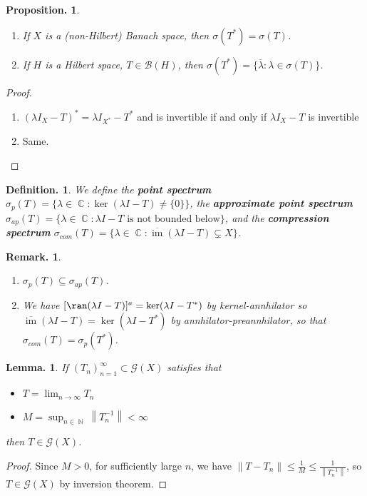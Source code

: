 \documentclass[11pt, a4paper]{memoir}
\DeclareMathOperator{\N}{{\mathbb{N}}}
\DeclareMathOperator{\C}{{\mathbb{C}}}
\newcommand{\norm}[1]{\ensuremath{\left\lVert#1\right\rVert}}
\theoremstyle{change}
\newtheorem{lemma}[theorem]{Lemma.}
\newtheorem{proposition}[theorem]{Proposition.}
\theoremstyle{plain}
\theoremstyle{nonumberplain}
\newtheorem{definition}{Definition.}
\newtheorem{remark}{Remark.}
\newtheorem{proof}{Proof}
\DeclareMathOperator{\im}{im}
\numberwithin{equation}{section}
\begin{document}
\begin{proposition}
    \begin{enumerate}[nl,r]
        \item If $X$ is a (non-Hilbert) Banach space, then $\sigma(T^*)=\sigma(T)$.
        \item If $H$ is a Hilbert space, $T\in\mathcal{B}(H)$, then $\sigma(T^*)=\{\overline{\lambda}:\lambda\in\sigma(T)\}$.
    \end{enumerate}
\end{proposition}
\begin{proof}
    \begin{enumerate}[nl,r]
        \item $(\lambda I_X-T)^*=\lambda I_{X^*}-T^*$ and is invertible if and only if $\lambda I_X-T$ is invertible
        \item Same.
    \end{enumerate}
\end{proof}
\begin{definition}
    We define the \textbf{point spectrum} $\sigma_p(T)=\{\lambda\in\C:\ker(\lambda I-T)\neq\{0\}\}$, the \textbf{approximate point spectrum} $\sigma_{ap}(T)=\{\lambda\in\C:\lambda I-T\text{ is not bounded below}\}$, and the \textbf{compression spectrum} $\sigma_{com}(T)=\{\lambda\in\C:\overline{\im}(\lambda I-T)\subsetneq X\}$.
\end{definition}
\begin{remark}
    \begin{enumerate}[nl,r]
        \item $\sigma_p(T)\subseteq\sigma_{ap}(T)$.
        \item We have $[\ran(\lambda I-T)]^a=\ker(\lambda I-T^*)$ by kernel-annhilator so $\overline{\im}(\lambda I-T)=\ker(\lambda I-T^*)$ by annhilator-preannhilator, so that $\sigma_{com}(T)=\sigma_p(T^*)$.
    \end{enumerate}
\end{remark}
\begin{lemma}
    If $(T_n)_{n=1}^\infty\subset\mathcal{G}(X)$ satisfies that
    \begin{itemize}[nl]
        \item $T=\lim_{n\to\infty}T_n$
        \item $M=\sup_{n\in\N}\norm{T_n^{-1}}<\infty$
    \end{itemize}
    then $T\in\mathcal{G}(X)$.
\end{lemma}
\begin{proof}
    Since $M>0$, for sufficiently large $n$, we have $\norm{T-T_n}\leq\frac{1}{M}\leq\frac{1}{\norm{T_n^{-1}}}$, so $T\in\mathcal{G}(X)$ by inversion theorem.
\end{proof}
\end{document}
